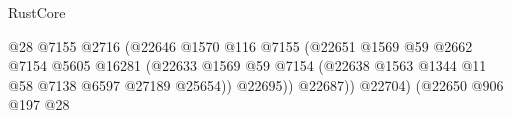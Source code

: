 \begin{lexlean}{RustCore}
\begin{coremodule}
                                                                    @28
                                                                    @7155
                                                                    @2716
                                                                    (@22646
                                                                      @1570
                                                                      @116
                                                                      @7155
                                                                      (@22651
                                                                        @1569
                                                                        @59
                                                                        @2662
                                                                        @7154
                                                                        @5605
                                                                        @16281
                                                                        (@22633
                                                                          @1569
                                                                          @59
                                                                          @7154
                                                                          (@22638
                                                                            @1563
                                                                            @1344
                                                                            @11
                                                                            @58
                                                                            @7138
                                                                            @6597
                                                                            @27189
                                                                            @25654))
                                                                        @22695))
                                                                    @22687))
                                                                @22704)
                                                              (@22650
                                                                @906
                                                                @197
                                                                @28

\end{coremodule}
\end{lexlean}
